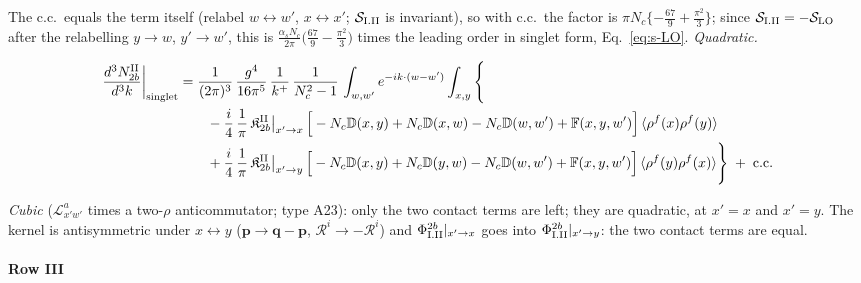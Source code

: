 \documentclass[10pt]{article}
\def\mf#1{\mathbb{#1}}
\begin{document}
The c.c.\ equals the term itself (relabel $w\leftrightarrow w'$, $x\leftrightarrow x'$; $\mathcal{S}_{\rm I.II}$ is invariant), so with c.c.\ the factor is $\pi N_{c}\{-\frac{67}{9}+\frac{\pi^{2}}{3}\}$; since $\mathcal{S}_{\rm I.II}=-\mathcal{S}_{\rm LO}$ after the relabelling $y\to w$, $y'\to w'$, this is $\frac{\alpha_{s}N_{c}}{2\pi}\big(\frac{67}{9}-\frac{\pi^{2}}{3}\big)$ times the leading order in singlet form, Eq.~\eqref{eq:s-LO}. \emph{Quadratic.}

\begin{align}
\frac{d^{3}N_{2b}^{\rm II}}{d^{3}k}\bigg|_{\rm singlet}&=\frac{1}{(2\pi)^{3}}\,\frac{g^{4}}{16\pi^{5}}\,\frac{1}{k^{+}}\,\frac{1}{N_{c}^{2}-1}\,\int_{w,w'}e^{-ik\cdot(w-w')}\int_{x,y}\Bigg\{\notag\\
&\qquad -\frac{i}{4}\,\frac{1}{\pi}\,\mathfrak{K}^{\rm II}_{2b}\big|_{x'\to x}\,\Big[-N_{c}\mf{D}(x,y)+N_{c}\mf{D}(x,w)-N_{c}\mf{D}(w,w')+\mf{F}(x,y,w')\Big]\,\langle\rho^{f}(x)\rho^{f}(y)\rangle\notag\\
&\qquad +\frac{i}{4}\,\frac{1}{\pi}\,\mathfrak{K}^{\rm II}_{2b}\big|_{x'\to y}\,\Big[-N_{c}\mf{D}(x,y)+N_{c}\mf{D}(y,w)-N_{c}\mf{D}(w,w')+\mf{F}(x,y,w')\Big]\,\langle\rho^{f}(y)\rho^{f}(x)\rangle\Bigg\}\;+\;{\rm c.c.}\label{eq:s-I-II-2b}
\end{align}

\emph{Cubic} ($\mathcal{L}^{a}_{x'w'}$ times a two-$\rho$ anticommutator; type A23): only the two contact terms are left; they are quadratic, at $x'=x$ and $x'=y$. The kernel is antisymmetric under $x\leftrightarrow y$ ($\mathbf{p}\to\mathbf{q}-\mathbf{p}$, $\mathcal{R}^{i}\to-\mathcal{R}^{i}$) and $\Phi^{2b}_{\rm I.II}|_{x'\to x}$ goes into $\Phi^{2b}_{\rm I.II}|_{x'\to y}$: the two contact terms are equal.

\paragraph*{Row III}
\end{document}
